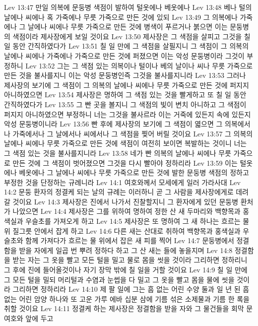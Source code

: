 Lev 13:47  만일 의복에 문둥병 색점이 발하여 털옷에나 베옷에나
Lev 13:48  베나 털의 날에나 씨에나 혹 가죽에나 무릇 가죽으로 만든 것에 있되
Lev 13:49  그 의복에나 가죽에나 그 날에나 씨에나 무릇 가죽으로 만든 것에 병색이 푸르거나 붉으면 이는 문둥병의 색점이라 제사장에게 보일 것이요
Lev 13:50  제사장은 그 색점을 살피고 그것을 칠 일 동안 간직하였다가
Lev 13:51  칠 일 만에 그 색점을 살필지니 그 색점이 그 의복의 날에나 씨에나 가죽에나 가죽으로 만든 것에 퍼졌으면 이는 악성 문둥병이라 그것이 부정하니
Lev 13:52  그는 그 색점 있는 의복이나 털이나 베의 날이나 씨나 무릇 가죽으로 만든 것을 불사를지니 이는 악성 문둥병인즉 그것을 불사를지니라
Lev 13:53  그러나 제사장의 보기에 그 색점이 그 의복의 날에나 씨에나 무릇 가죽으로 만든 것에 퍼지지 아니하였으면
Lev 13:54  제사장은 명하여 그 색점 있는 것을 빨게하고 또 칠 일 동안 간직하였다가
Lev 13:55  그 빤 곳을 볼지니 그 색점의 빛이 변치 아니하고 그 색점이 퍼지지 아니하였으면 부정하니 너는 그것을 불사르라 이는 거죽에 있든지 속에 있든지 악성 문둥병이니라
Lev 13:56  빤 후에 제사장의 보기에 그 색점이 엷으면 그 의복에서나 가죽에서나 그 날에서나 씨에서나 그 색점을 찢어 버릴 것이요
Lev 13:57  그 의복의 날에나 씨에나 무릇 가죽으로 만든 것에 색점이 여전히 보이면 복발하는 것이니 너는 그 색점 있는 것을 불사를지니라
Lev 13:58  네가 빤 의복의 날에나 씨에나 무릇 가죽으로 만든 것에 그 색점이 벗어졌으면 그것을 다시 빨아야 정하리라
Lev 13:59  이는 털옷에나 베옷에나 그 날에나 씨에나 무릇 가죽으로 만든 것에 발한 문둥병 색점의 정하고 부정한 것을 단정하는 규례니라
Lev 14:1  여호와께서 모세에게 일러 가라사대
Lev 14:2  문둥 환자의 정결케 되는 날의 규례는 이러하니 곧 그 사람을 제사장에게로 데려 갈 것이요
Lev 14:3  제사장은 진에서 나가서 진찰할지니 그 환자에게 있던 문둥병 환처가 나았으면
Lev 14:4  제사장은 그를 위하여 명하여 정한 산 새 두마리와 백향목과 홍색실과 우슬초를 가져오게 하고
Lev 14:5  제사장은 또 명하여 그 새 하나는 흐르는 물 위 질그릇 안에서 잡게 하고
Lev 14:6  다른 새는 산대로 취하여 백향목과 홍색실과 우슬초와 함께 가져다가 흐르는 물 위에서 잡은 새 피를 찍어
Lev 14:7  문둥병에서 정결함을 받을 자에게 일곱 번 뿌려 정하다 하고 그 산 새는 들에 놓을지며
Lev 14:8  정결함을 받는 자는 그 옷을 빨고 모든 털을 밀고 물로 몸을 씻을 것이라 그리하면 정하리니 그 후에 진에 들어올것이나 자기 장막 밖에 칠 일을 거할 것이요
Lev 14:9  칠 일 만에 그 모든 털을 밀되 머리털과 수염과 눈썹을 다 밀고 그 옷을 빨고 몸을 물에 씻을 것이라 그리하면 정하리라
Lev 14:10  제 팔 일에 그는 흠 없는 어린 수양 둘과 일 년 된 흠 없는 어린 암양 하나와 또 고운 가루 에바 십분 삼에 기름 섞은 소제물과 기름 한 록을 취할 것이요
Lev 14:11  정결케 하는 제사장은 정결함을 받을 자와 그 물건들을 회막 문 여호와 앞에 두고
